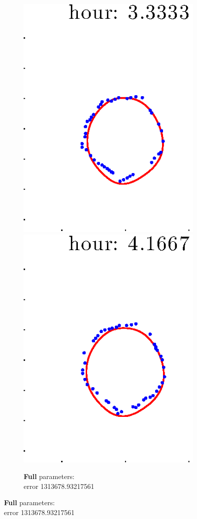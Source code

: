 \documentclass[12pt]{article}
\begin{document}
\begin{figure}[h!]
\begin{subfigure}[b]{.3\textwidth}
		\includegraphics[height=.15\textheight]{Pos14exp8/firsthalf/full5.eps}
		\includegraphics[height=.15\textheight]{Pos14exp8/firsthalf/full6.eps}
		\caption{\textbf{Full} parameters: \\error 1313678.93217561}

\end{subfigure}
\end{figure}
\end{document}
